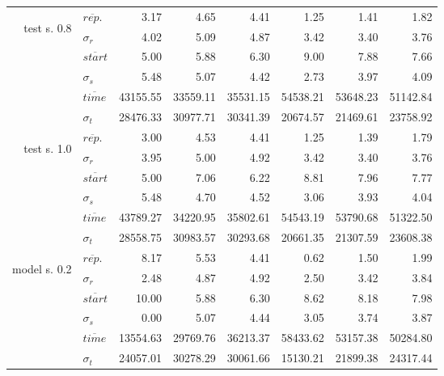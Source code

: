 \begin{tabular}{r l | r r r r r | r}
\hline
\multirow{6}{*}{\begin{sideways}test s. 0.8\end{sideways}}
& $\overline{rep.}$ & 3.17 & 4.65 & 4.41 & 1.25 & 1.41 & 1.82 \\ 
& $\sigma_{r}$ & 4.02 & 5.09 & 4.87 & 3.42 & 3.40 & 3.76 \\ 
& $\overline{start}$ & 5.00 & 5.88 & 6.30 & 9.00 & 7.88 & 7.66 \\ 
& $\sigma_{s}$ & 5.48 & 5.07 & 4.42 & 2.73 & 3.97 & 4.09 \\ 
& $\overline{time}$ & 43155.55 & 33559.11 & 35531.15 & 54538.21 & 53648.23 & 51142.84 \\ 
& $\sigma_{t}$ &  28476.33 & 30977.71 & 30341.39 & 20674.57 & 21469.61 & 23758.92 \\ 

\hline
\multirow{6}{*}{\begin{sideways}test s. 1.0\end{sideways}}

& $\overline{rep.}$ & 3.00 & 4.53 & 4.41 & 1.25 & 1.39 & 1.79 \\ 
& $\sigma_{r}$ & 3.95 & 5.00 & 4.92 & 3.42 & 3.40 & 3.76 \\ 
& $\overline{start}$ & 5.00 & 7.06 & 6.22 & 8.81 & 7.96 & 7.77 \\ 
& $\sigma_{s}$ & 5.48 & 4.70 & 4.52 & 3.06 & 3.93 & 4.04 \\ 
& $\overline{time}$ & 43789.27 & 34220.95 & 35802.61 & 54543.19 & 53790.68 & 51322.50 \\ 
& $\sigma_{t}$ &  28558.75 & 30983.57 & 30293.68 & 20661.35 & 21307.59 & 23608.38 \\ 

\hline
\multirow{6}{*}{\begin{sideways}model s. 0.2 \end{sideways}}

& $\overline{rep.}$ & 8.17 & 5.53 & 4.41 & 0.62 & 1.50 & 1.99 \\ 
& $\sigma_{r}$ & 2.48 & 4.87 & 4.92 & 2.50 & 3.42 & 3.84 \\ 
& $\overline{start}$ &  10.00 & 5.88 & 6.30 & 8.62 & 8.18 & 7.98 \\ 
& $\sigma_{s}$ &  0.00 & 5.07 & 4.44 & 3.05 & 3.74 & 3.87 \\ 
& $\overline{time}$ &  13554.63 & 29769.76 & 36213.37 & 58433.62 & 53157.38 & 50284.80 \\ 
& $\sigma_{t}$ &  24057.01 & 30278.29 & 30061.66 & 15130.21 & 21899.38 & 24317.44 \\ 


\end{tabular}
